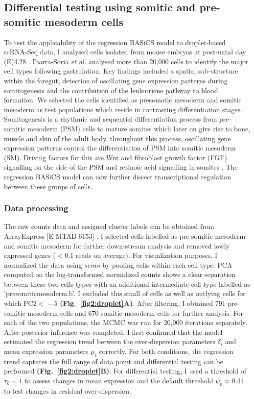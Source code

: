 \newpage

\subsection{Differential testing using somitic and pre-somitic mesoderm cells}

To test the applicability of the regression BASiCS model to droplet-based scRNA-Seq data, I analysed cells isolated from mouse embryos at post-natal day (E)4.28 \citep{Ibarra-Soria2018}. Ibarra-Soria \emph{et al.} analysed more than 20,000 cells to identify the major cell types following gastrulation. Key findings included a spatial sub-structure within the foregut, detection of oscillating gene expression patterns during somitogenesis and the contribution of the leukotriene pathway to blood formation.  We selected the cells identified as presomotic mesoderm and somitic mesoderm as test populations which reside in contrasting differentiation stages. Somitogenesis is a rhythmic and sequential differentiation process from pre-somitic mesoderm (PSM) cells to mature somites which later on give rise to bone, muscle and skin of the adult body. throughout this process, oscillating gene expression patterns control the differentiation of PSM into somitic mesoderm (SM). Driving factors for this are Wnt and fibroblast growth factor (FGF) signalling on the side of the PSM and retinoic acid signalling in somites \cite{Oates2012}. The regression BASiCS model can now further dissect transcriptional regulation between these groups of cells.

\subsubsection{Data processing}

The raw counts data and assigned cluster labels can be obtained from ArrayExpress [E-MTAB-6153] \citep{Ibarra-Soria2018}. I selected cells labelled as pre-somitic mesoderm and somitic mesoderm for further down-stream analysis and removed lowly expressed genes ($< 0.1$ reads on average). For visualization purposes, I normalized the data using \emph{scran} by pooling cells within each cell type. PCA computed on the log-transformed normalized counts shows a clear separation between these two cells types with an additional intermediate cell type labelled as 'presomiticmesoderm.b'. I excluded this small of cells as well as outlying cells for which $\text{PC2}{}<{}-5$ \textbf{(Fig.~\ref{fig2:droplet}A)}. After filtering, I obtained 791 pre-somitic mesoderm cells and 670 somitic mesoderm cells for further analysis. For each of the two populations, the MCMC was run for 20,000 iterations separately. After posterior inference was completed, I first confirmed that the model estimated the regression trend between the over-dispersion parameters $\delta_i$ and mean expression parameters $\mu_i$ correctly. For both conditions, the regression trend captures the full range of data point and differential testing can be performed \textbf{(Fig.~\ref{fig2:droplet}B)}. For differential testing, I used a threshold of $\tau_0=1$ to assess changes in mean expression and the default threshold $\psi_0\approx{}0.41$ to test changes in residual over-dispersion.  

